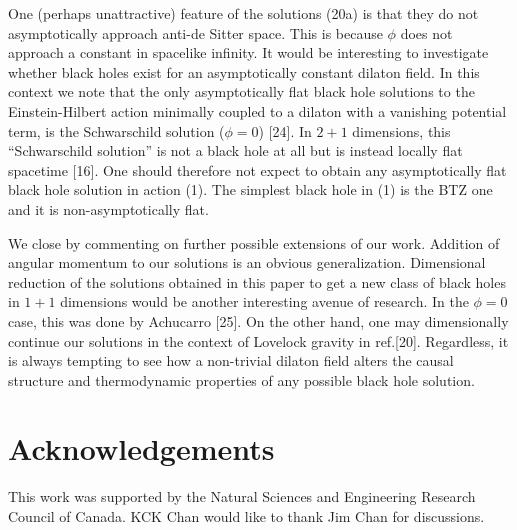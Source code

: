 One (perhaps unattractive) feature of the solutions (20a)
is that they do not
asymptotically approach anti-de Sitter space. This is because
$\phi$ does not approach a constant in spacelike infinity.
It would be interesting to investigate whether black holes
exist for an asymptotically constant dilaton field.
In this context we note that
the only asymptotically flat black hole solutions
to the Einstein-Hilbert action minimally coupled to
a dilaton with a vanishing potential term, is the Schwarschild
solution ($\phi=0$) [24].
In $2+1$ dimensions, this ``Schwarschild solution''
is not a black hole at all but is instead locally flat spacetime [16].
One should therefore not expect to obtain any asymptotically
flat black hole solution in action (1). The
simplest black hole in (1) is the BTZ one and it is
non-asymptotically flat.

We close by commenting on further possible extensions of our work.
Addition of angular momentum to our solutions is an obvious generalization.
Dimensional reduction of the solutions obtained in this paper to get a new
class of black holes in $1+1$ dimensions would be another interesting
avenue of research.
In the $\phi=0$ case, this was done by Achucarro [25].
On the other hand, one may dimensionally continue
our solutions in the context of Lovelock gravity in
ref.[20]. Regardless, it is always tempting to see how a non-trivial
dilaton field alters the causal structure and thermodynamic
properties of any possible black hole solution.


\section{Acknowledgements}

This work was supported by the Natural Sciences and Engineering Research
Council of Canada. KCK Chan would like to thank Jim Chan for discussions.

